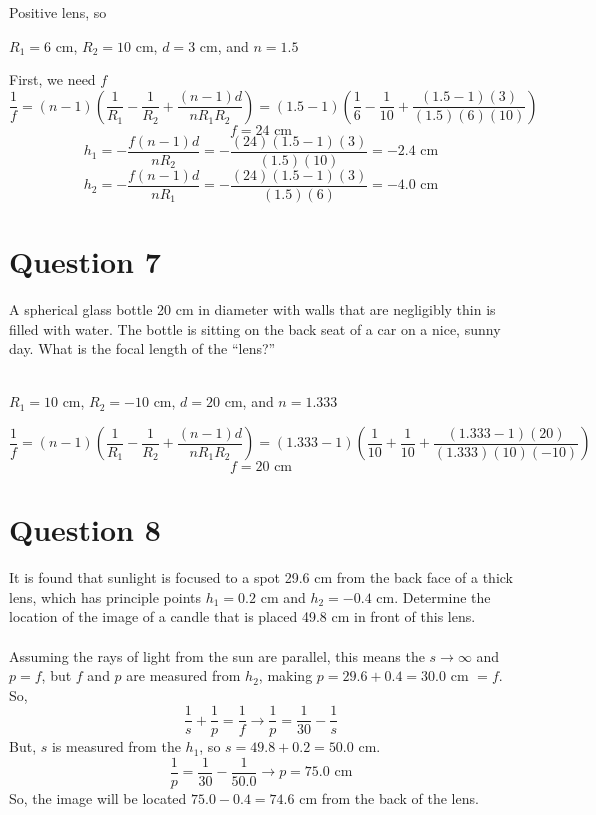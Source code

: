\documentclass[a4paper]{article}
\begin{document}
Positive lens, so
\begin{center}
    $R_1 = 6$ cm, $R_2 = 10$ cm, $d = 3$ cm, and $n = 1.5$
\end{center}
First, we need $f$
$$ \frac{1}{f} = (n - 1) \left(\frac{1}{R_1} - \frac{1}{R_2} + \frac{(n-1)d}{nR_1 R_2}\right) = (1.5 - 1) \left(\frac{1}{6} - \frac{1}{10} + \frac{(1.5-1)(3)}{(1.5)(6)(10)}\right)$$
$$ f = 24 \textrm{ cm} $$
$$ h_1 = - \frac{f(n-1)d}{nR_2} = - \frac{(24)(1.5-1)(3)}{(1.5)(10)} = -2.4 \textrm{ cm}$$
$$ h_2 = - \frac{f(n-1)d}{nR_1} = - \frac{(24)(1.5-1)(3)}{(1.5)(6)} = -4.0 \textrm{ cm}$$

\section*{Question 7}
A spherical glass bottle 20 cm in diameter with walls that are negligibly thin is filled with water.
The bottle is sitting on the back seat of a car on a nice, sunny day. What is the focal length of the
“lens?”\\\\

\begin{center}
    $R_1=10$ cm, $R_2=-10$ cm, $d = 20$ cm, and $n = 1.333$
\end{center}
$$ \frac{1}{f} = (n - 1) \left(\frac{1}{R_1} - \frac{1}{R_2} + \frac{(n-1)d}{nR_1 R_2}\right) = (1.333 - 1) \left(\frac{1}{10} + \frac{1}{10} + \frac{(1.333-1)(20)}{(1.333)(10)(-10)}\right)$$
$$ f = 20 \textrm{ cm}$$


\section*{Question 8}
It is found that sunlight is focused to a spot 29.6 cm from the back face of a thick lens, which has
principle points $h_1 = 0.2$ cm and $h_2 = -0.4$ cm. Determine the location of the image of a candle that
is placed 49.8 cm in front of this lens.\\\\

Assuming the rays of light from the sun are parallel, this means the $s \rightarrow \infty$ and $p=f$, but $f$ and $p$ are measured from $h_2$, making
$p = 29.6 + 0.4 = 30.0$ cm $=f$. So,
$$ \frac{1}{s} + \frac{1}{p} = \frac{1}{f} \rightarrow \frac{1}{p} = \frac{1}{30} - \frac{1}{s}$$
But, $s$ is measured from the $h_1$, so $s = 49.8 + 0.2 = 50.0$ cm.
$$ \frac{1}{p} = \frac{1}{30} - \frac{1}{50.0} \rightarrow p=75.0 \textrm{ cm}$$
So, the image will be located $75.0 - 0.4=74.6$ cm from the back of the lens.
\end{document}
